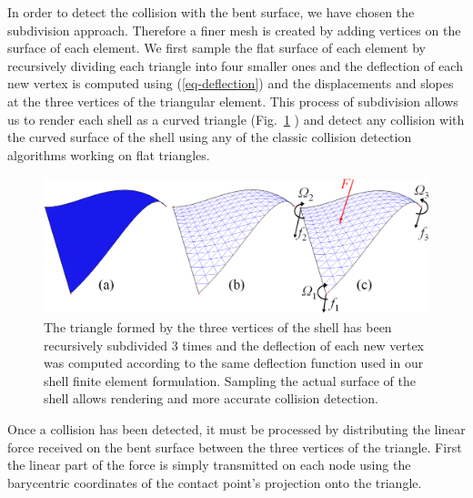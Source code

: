 \documentclass{llncs}
\begin{document}
In order to detect the collision with the bent surface, we have chosen the subdivision approach. Therefore a finer mesh is created by adding vertices on the surface of each element. We first sample the flat surface of each element by recursively dividing each triangle into four smaller ones and the deflection of each new vertex is computed using (\ref{eq-deflection}) and the displacements and slopes at the three vertices of the triangular element. This process of subdivision allows us to render each shell as a curved triangle (Fig.~\ref{fig-shell} ) and detect any collision with the curved surface of the shell using any of the classic collision detection algorithms working on flat triangles.
\begin{figure}
\centering
\includegraphics[height=4cm]{images/shell_curvature2.png}
\caption {The triangle formed by the three vertices of the shell has been recursively subdivided 3 times and the deflection of each new vertex was computed according to the same deflection function used in our shell finite element formulation. Sampling the actual surface of the shell allows rendering and more accurate collision detection.}
\label{fig-shell}
\end{figure}

Once a collision has been detected, it must be processed by distributing the linear force received on the bent surface between the three vertices of the triangle. First the linear part of the force is simply transmitted on each node using the barycentric coordinates of the contact point's projection onto the triangle. 
\end{document}
